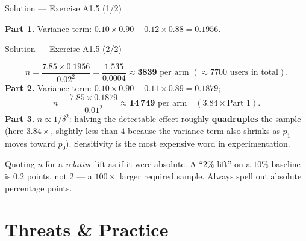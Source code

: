 \documentclass[aspectratio=169,11pt]{beamer}
\begin{document}
\begin{frame}{Solution --- Exercise A1.5 (1/2)}
\begin{solutionbox}
  \textbf{Part 1.} Variance term: $0.10 \times 0.90 + 0.12 \times 0.88 = 0.1956$.
\end{solutionbox}
\end{frame}

\begin{frame}{Solution --- Exercise A1.5 (2/2)}
\begin{solutionbox}
  \[
    n = \frac{7.85 \times 0.1956}{0.02^2} = \frac{1.535}{0.0004} \approx \mathbf{3839}
    \text{ per arm } (\approx 7700 \text{ users in total}).
  \]
  \textbf{Part 2.} Variance term: $0.10\times0.90 + 0.11\times0.89 = 0.1879$;
  \[
    n = \frac{7.85 \times 0.1879}{0.01^2} \approx \mathbf{14\,749} \text{ per arm}
    \quad (3.84\times \text{Part 1}).
  \]
  \textbf{Part 3.} $n \propto 1/\delta^2$: halving the detectable effect roughly
  \textbf{quadruples} the sample (here $3.84\times$, slightly less than $4$ because the
  variance term also shrinks as $p_1$ moves toward $p_0$). Sensitivity is the most
  expensive word in experimentation.
\end{solutionbox}
\begin{mistake}
  Quoting $n$ for a \emph{relative} lift as if it were absolute. A ``$2\%$ lift'' on a
  $10\%$ baseline is $0.2$ points, not $2$ --- a $100\times$ larger required sample.
  Always spell out absolute percentage points.
\end{mistake}
\end{frame}

\section{Threats \& Practice}
\end{document}

